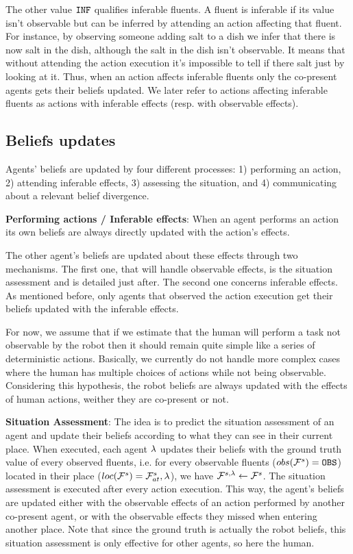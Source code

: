 \documentclass[letterpaper]{article} %
\begin{document}
The other value $\texttt{INF}$ qualifies inferable fluents. A fluent is inferable if its value isn't observable but can be inferred by attending an action affecting that fluent. For instance, by observing someone adding salt to a dish we infer that there is now salt in the dish, although the salt in the dish isn't observable. It means that without attending the action execution it's impossible to tell if there salt just by looking at it. Thus, when an action affects inferable fluents only the co-present agents gets their beliefs updated. We later refer to actions affecting inferable fluents as actions with inferable effects (resp. with observable effects).


\subsection{Beliefs updates}

Agents' beliefs are updated by four different processes: 1) performing an action, 2) attending inferable effects, 3) assessing the situation, and 4) communicating about a relevant belief divergence.  

\textbf{Performing actions / Inferable effects}: 
When an agent performs an action its own beliefs are always directly updated with the action's effects.

The other agent's beliefs are updated about these effects through two mechanisms. The first one, that will handle observable effects, is the situation assessment and is detailed just after. 
The second one concerns inferable effects. As mentioned before, only agents that observed the action execution get their beliefs updated with the inferable effects.

For now, we assume that if we estimate that the human will perform a task not observable by the robot then it should remain quite simple like a series of deterministic actions. Basically, we currently do not handle more complex cases where the human has multiple choices of actions while not being observable. Considering this hypothesis, the robot beliefs are always updated with the effects of human actions, weither they are co-present or not.

\textbf{Situation Assessment}:
The idea is to predict the situation assessment of an agent and update their beliefs according to what they can see in their current place. When executed, each agent $\lambda$ updates their beliefs with the ground truth value of every observed fluents, i.e. for every observable fluents ($obs( \mathcal{F}^{s}_{}{} ) = \texttt{OBS}$) located in their place ($loc(\mathcal{F}^{s}_{}{}) = \mathcal{F}^{s}_{at}{,\lambda}$), we have $\mathcal{F}^{s,\lambda}_{}{} \gets \mathcal{F}^{s}_{}{}$. The situation assessment is executed after every action execution. This way, the agent's beliefs are updated either with the observable effects of an action performed by another co-present agent, or with the observable effects they missed when entering another place. 
Note that since the ground truth is actually the robot beliefs, this situation assessment is only effective for other agents, so here the human. 
\end{document}
